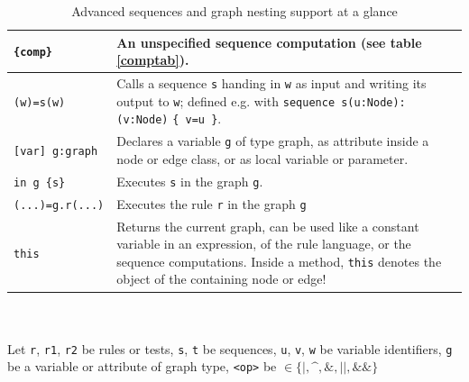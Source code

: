 \begin{table}[htbp]
\begin{minipage}{\linewidth}
\begin{tabularx}{\linewidth}{|lX|}
\hline
\texttt{\{comp\}}	& An unspecified sequence computation (see table \ref{comptab}).\\
\hline
\texttt{(w)=s(w)} & Calls a sequence \texttt{s} handing in \texttt{w} as input and writing its output to \texttt{w}; defined e.g. with \texttt{sequence s(u:Node):(v:Node)} \texttt{\{ v=u \}}.\\
\hline
\hline
\texttt{[var] g:graph}	& Declares a variable \texttt{g} of type graph, as attribute inside a node or edge class, or as local variable or parameter.\\
\hline
\texttt{in g \{s\}}	& Executes \texttt{s} in the graph \texttt{g}.\\
\hline
\texttt{(...)=g.r(...)} & Executes the rule \texttt{r} in the graph \texttt{g}\\
\hline
\texttt{this} & Returns the current graph, can be used like a constant variable in an expression, of the rule language, or the sequence computations. Inside a method, \texttt{this} denotes the object of the containing node or edge!\\
\hline
\end{tabularx}\indexmain{\texttt{<>}}\indexmain{\texttt{<<;>>}}
\end{minipage}\\
\\ 
{\small Let \texttt{r}, \texttt{r1}, \texttt{r2} be rules or tests, \texttt{s}, \texttt{t} be sequences, \texttt{u}, \texttt{v}, \texttt{w} be variable identifiers, \texttt{g} be a variable or attribute of graph type, \texttt{<op>} be $\in \{\texttt{|}, \texttt{\textasciicircum}, \texttt{\&}, \texttt{||}, \texttt{\&\&}\}$ }%
\caption{Advanced sequences and graph nesting support at a glance}
\label{seqtab}
\end{table}
 

